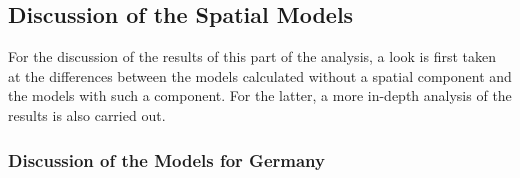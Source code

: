 \subsection{Discussion of the Spatial Models}
For the discussion of the results of this part of the analysis, a look is first taken at the differences between the models calculated without a spatial component and the models with such a component. For the latter, a more in-depth analysis of the results is also carried out.
\subsubsection{Discussion of the Models for Germany}
